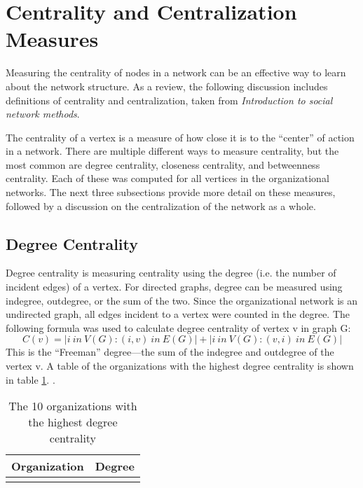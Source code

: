 \section{Centrality and Centralization Measures}


Measuring the centrality of nodes in a network can be an effective way to learn about the network structure. As a review, the following discussion includes definitions of centrality and centralization, taken from \textit{Introduction to social network methods}\cite{hanneman}.

The centrality of a vertex is a measure of how close it is to the ``center'' of action in a network. There are multiple different ways to measure centrality, but the most common are degree centrality, closeness centrality, and betweenness centrality. Each of these was computed for all vertices in the organizational networks. The next three subsections provide more detail on these measures, followed by a discussion on the centralization of the network as a whole.

\subsection{Degree Centrality}
Degree centrality is measuring centrality using the degree (i.e. the number of incident edges) of a vertex. For directed graphs, degree can be measured using indegree, outdegree, or the sum of the two. Since the organizational network is an undirected graph, all edges incident to a vertex were counted in the degree. The following formula was used to calculate degree centrality of vertex v in graph G: 
\begin{equation*}
C(v) = | {i\:in\:V(G) : (i,v)\:in\:E(G)} |+|{i\:in\:V(G) : (v,i)\:in\:E(G)}|
\end{equation*}
This is the ``Freeman'' degree---the sum of the indegree and outdegree of the vertex v. A table of the organizations with the highest degree centrality is shown in table \ref{tab:degree}. . 

\begin{table}
	\begin{tabular}{l|c}%
		\bfseries Organization & \bfseries Degree%
		\csvreader[head to column names]{degree.csv}{}%
		{\\\hline\organizationa & \scorea}%
	\end{tabular}
	\centering
	\caption{The 10 organizations with the highest degree centrality}\label{tab:degree}
\end{table}
